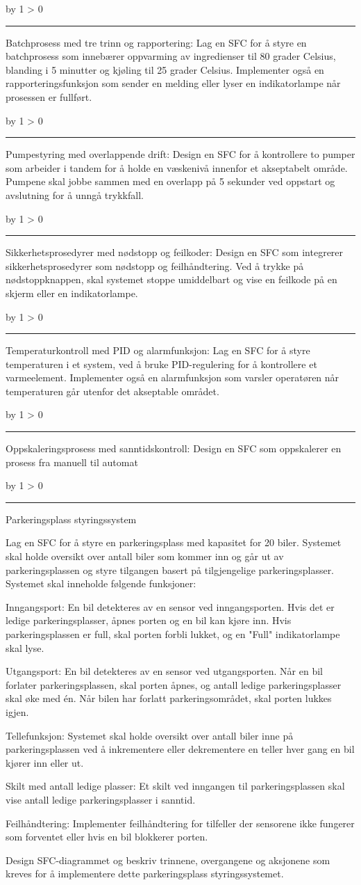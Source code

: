\documentclass[12pt,a4paper]{article}
\def\oppgave{
            \advance\questnum by 1
            \ifnum \questnum > 0
	    \vskip 1cm
                 \vskip 10pt
                 \leftline{Oppgave \the\questnum}
                 \hrule
                 \vskip 3pt \fi}
\begin{document}
\oppgave{}%
\vskip 2.5pt 
Batchprosess med tre trinn og rapportering:
Lag en SFC for å styre en batchprosess som innebærer oppvarming av ingredienser til 80 grader Celsius, blanding i 5 minutter og kjøling til 25 grader Celsius. Implementer også en rapporteringsfunksjon som sender en melding eller lyser en indikatorlampe når prosessen er fullført.

\oppgave{}%
\vskip 2.5pt 
Pumpestyring med overlappende drift:
Design en SFC for å kontrollere to pumper som arbeider i tandem for å holde en væskenivå innenfor et akseptabelt område. Pumpene skal jobbe sammen med en overlapp på 5 sekunder ved oppstart og avslutning for å unngå trykkfall.

\oppgave{}%
\vskip 2.5pt 
Sikkerhetsprosedyrer med nødstopp og feilkoder:
Design en SFC som integrerer sikkerhetsprosedyrer som nødstopp og feilhåndtering. Ved å trykke på nødstoppknappen, skal systemet stoppe umiddelbart og vise en feilkode på en skjerm eller en indikatorlampe.

\oppgave{}%
\vskip 2.5pt 
Temperaturkontroll med PID og alarmfunksjon:
Lag en SFC for å styre temperaturen i et system, ved å bruke PID-regulering for å kontrollere et varmeelement. Implementer også en alarmfunksjon som varsler operatøren når temperaturen går utenfor det akseptable området.

\oppgave{}%
\vskip 2.5pt 
Oppskaleringsprosess med sanntidskontroll:
Design en SFC som oppskalerer en prosess fra manuell til automat

\oppgave{}%
\vskip 2.5pt
Parkeringsplass styringssystem

\vskip 2.5pt
Lag en SFC for å styre en parkeringsplass med kapasitet for 20 biler. Systemet skal holde oversikt over antall biler som kommer inn og går ut av parkeringsplassen og styre tilgangen basert på tilgjengelige parkeringsplasser. Systemet skal inneholde følgende funksjoner:

\vskip 2.5pt
Inngangsport: En bil detekteres av en sensor ved inngangsporten. Hvis det er ledige parkeringsplasser, åpnes porten og en bil kan kjøre inn. Hvis parkeringsplassen er full, skal porten forbli lukket, og en "Full" indikatorlampe skal lyse.

\vskip 2.5pt
Utgangsport: En bil detekteres av en sensor ved utgangsporten. Når en bil forlater parkeringsplassen, skal porten åpnes, og antall ledige parkeringsplasser skal øke med én. Når bilen har forlatt parkeringsområdet, skal porten lukkes igjen.

\vskip 2.5pt
Tellefunksjon: Systemet skal holde oversikt over antall biler inne på parkeringsplassen ved å inkrementere eller dekrementere en teller hver gang en bil kjører inn eller ut.

\vskip 2.5pt
Skilt med antall ledige plasser: Et skilt ved inngangen til parkeringsplassen skal vise antall ledige parkeringsplasser i sanntid.

\vskip 2.5pt
Feilhåndtering: Implementer feilhåndtering for tilfeller der sensorene ikke fungerer som forventet eller hvis en bil blokkerer porten.

\vskip 2.5pt
Design SFC-diagrammet og beskriv trinnene, overgangene og aksjonene som kreves for å implementere dette parkeringsplass styringssystemet.

\vskip 2.5pt
\end{document}
